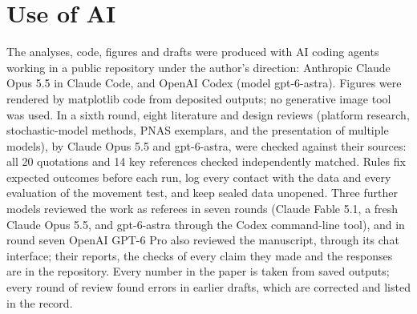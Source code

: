 \documentclass[10pt]{article}
\begin{document}
\section{Use of AI}
The analyses, code, figures and drafts were produced with AI coding agents working in a public repository under the author's direction: Anthropic Claude Opus 5.5 in Claude Code, and OpenAI Codex (model gpt-6-astra). Figures were rendered by matplotlib code from deposited outputs; no generative image tool was used. In a sixth round, eight literature and design reviews (platform research, stochastic-model methods, PNAS exemplars, and the presentation of multiple models), by Claude Opus 5.5 and gpt-6-astra, were checked against their sources: all 20 quotations and 14 key references checked independently matched. Rules fix expected outcomes before each run, log every contact with the data and every evaluation of the movement test, and keep sealed data unopened. Three further models reviewed the work as referees in seven rounds (Claude Fable 5.1, a fresh Claude Opus 5.5, and gpt-6-astra through the Codex command-line tool), and in round seven OpenAI GPT-6 Pro also reviewed the manuscript, through its chat interface; their reports, the checks of every claim they made and the responses are in the repository. Every number in the paper is taken from saved outputs; every round of review found errors in earlier drafts, which are corrected and listed in the record.



\end{document}
